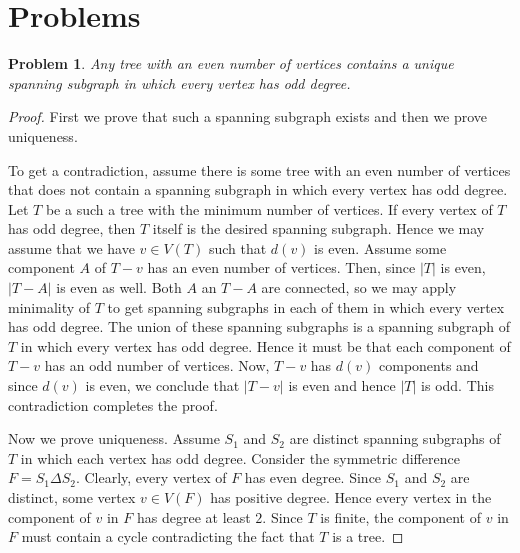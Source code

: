 \documentclass[12pt]{article}
\theoremstyle{plain}
\newtheorem{prob}[thm]{Problem}
\theoremstyle{definition}
\theoremstyle{remark}
\newcommand{\card}[1]{\left|#1\right|}
\begin{document}
\section{Problems}
\begin{prob}
Any tree with an even number of vertices contains a unique spanning subgraph in which every vertex has odd degree.
\end{prob}
\begin{proof}
First we prove that such a spanning subgraph exists and then we prove uniqueness.  

To get a contradiction, assume there is some tree with an even number of vertices that does not contain a spanning subgraph in which every vertex has odd degree.  Let $T$ be a such a tree with the minimum number of vertices.  If every vertex of $T$ has odd degree, then $T$ itself is the desired spanning subgraph.  Hence we may assume that we have $v \in V(T)$ such that $d(v)$ is even.  Assume some component $A$ of $T - v$ has an even number of vertices. Then, since $\card{T}$ is even, $\card{T-A}$ is even as well.  Both $A$ an $T-A$ are connected, so we may apply minimality of $T$ to get spanning subgraphs in each of them in which every vertex has odd degree.  The union of these spanning subgraphs is a spanning subgraph of $T$ in which every vertex has odd degree.  Hence it must be that each component of $T-v$ has an odd number of vertices.  Now, $T-v$ has $d(v)$ components and since $d(v)$ is even, we conclude that $\card{T-v}$ is even and hence $\card{T}$ is odd.  This contradiction completes the proof.

Now we prove uniqueness.  Assume $S_1$ and $S_2$ are distinct spanning subgraphs of $T$ in which each vertex has odd degree.  Consider the symmetric difference $F = S_1 \Delta S_2$.  Clearly, every vertex of $F$ has even degree.  Since $S_1$ and $S_2$ are distinct, some vertex $v \in V(F)$ has positive degree.  Hence every vertex in the component of $v$ in $F$ has degree at least $2$.  Since $T$ is finite, the component of $v$ in $F$ must contain a cycle contradicting the fact that $T$ is a tree.
\end{proof}
\end{document}
